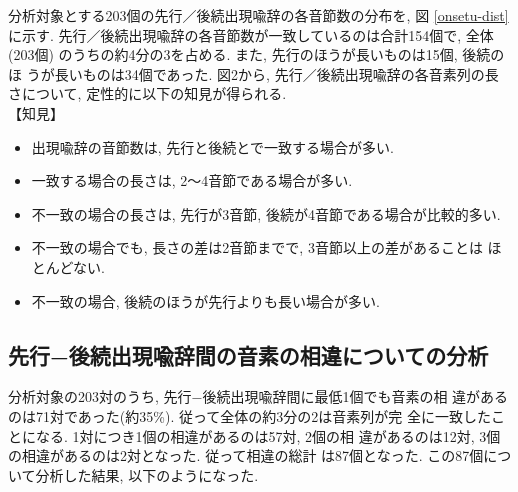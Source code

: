 分析対象とする203個の先行／後続出現喩辞の各音節数の分布を, 図
\ref{onsetu-dist}に示す.
先行／後続出現喩辞の各音節数が一致しているのは合計154個で, 全体(203個)
のうちの約4分の3を占める. また, 先行のほうが長いものは15個, 後続のほ
うが長いものは34個であった. 図2から, 先行／後続出現喩辞の各音素列の長
さについて, 定性的に以下の知見が得られる.\vspace*{2em}\\
【知見】
\begin{itemize}
\item 出現喩辞の音節数は, 先行と後続とで一致する場合が多い. 
\item 一致する場合の長さは, 2〜4音節である場合が多い. 
\item 不一致の場合の長さは, 先行が3音節, 後続が4音節である場合が比較的多い. 
\item 不一致の場合でも, 長さの差は2音節までで, 3音節以上の差があることは
ほとんどない.  
\item 不一致の場合, 後続のほうが先行よりも長い場合が多い. 
\end{itemize}


\subsection{先行−後続出現喩辞間の音素の相違についての分析}

分析対象の203対のうち, 先行−後続出現喩辞間に最低1個でも音素の相
違があるのは71対であった(約35\%). 従って全体の約3分の2は音素列が完
全に一致したことになる. 1対につき1個の相違があるのは57対, 2個の相
違があるのは12対, 3個の相違があるのは2対となった. 従って相違の総計
は87個となった. この87個について分析した結果, 以下のようになった. 
\vspace*{1em}

